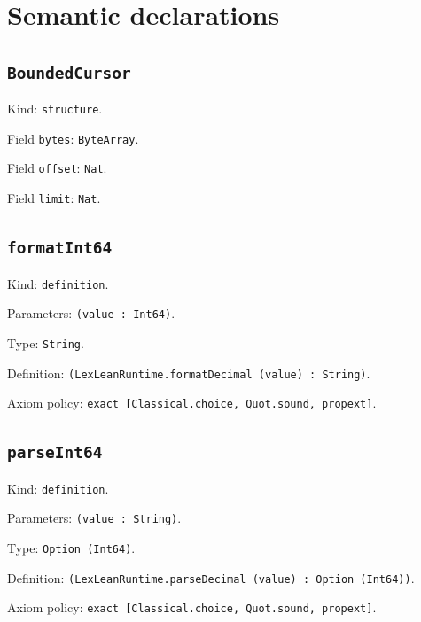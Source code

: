 \documentclass[11pt]{article}
\begin{document}
\section*{Semantic declarations}
\subsection*{\texttt{BoundedCursor}}
\noindent Kind: \texttt{structure}.\par
\noindent Field \texttt{bytes}: \texttt{ByteArray}.\par
\noindent Field \texttt{offset}: \texttt{Nat}.\par
\noindent Field \texttt{limit}: \texttt{Nat}.\par
\subsection*{\texttt{formatInt64}}
\noindent Kind: \texttt{definition}.\par
\noindent Parameters: \texttt{(value : Int64)}.\par
\noindent Type: \texttt{String}.\par
\noindent Definition: \texttt{(LexLeanRuntime.formatDecimal (value) : String)}.\par
\noindent Axiom policy: \texttt{exact [Classical.choice, Quot.sound, propext]}.\par
\subsection*{\texttt{parseInt64}}
\noindent Kind: \texttt{definition}.\par
\noindent Parameters: \texttt{(value : String)}.\par
\noindent Type: \texttt{Option (Int64)}.\par
\noindent Definition: \texttt{(LexLeanRuntime.parseDecimal (value) : Option (Int64))}.\par
\noindent Axiom policy: \texttt{exact [Classical.choice, Quot.sound, propext]}.\par
\end{document}
